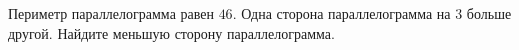 \begin{ex}
	\begin{condition}
		Периметр параллелограмма равен \( 46 \). Одна сторона параллелограмма на \( 3 \) больше другой. Найдите меньшую сторону параллелограмма.
	\end{condition}
\end{ex}